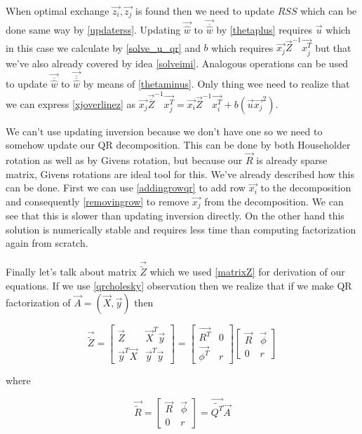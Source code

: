 When optimal exchange $\vec{z_i}, \vec{z_j}$ is found then we need to update $RSS$ which can be done same way by \ref{updaterss}. Updating $\vec{\hat{w}}$ to  $\vec{\overline{\hat{w}}}$ by \ref{thetaplus} requires
$\vec{u}$  which in this case we calculate by \ref{solve_u_qr} and $b$ which requires  $\vec{x_j}\vec{Z}^{-1}\vec{x_j^T}$ but that we've also already covered by idea \ref{solveimi}. Analogous operations can be used to update $\vec{\overline{\hat{w}}}$ to $\vec{\overline{\overline{\hat{w}}}}$  by means of \ref{thetaminus}. Only thing wee need to realize that we can express \ref{xjoverlinez} as $\vec{x_j}\vec{\overline{{Z}}}^{-1}\vec{x_j^T} = \vec{x_i}\vec{{{Z}}}^{-1}\vec{x_i^T} + b(\vec{u}\vec{x_j}^2)$.

We can't use updating inversion because we don't have one so we need to somehow update our QR decomposition. This can be done by both Householder rotation as well as by Givens rotation, but because our $\vec{R}$ is already sparse matrix, Givens rotations are ideal tool for this. We've already described how this can be done. First we can use \ref{addingrowqr} to add row $\vec{x_i}$ to the decomposition and consequently \ref{removingrow} to remove $\vec{x_j}$  from the decomposition. We can see that this is slower than updating inversion directly. On the other hand this solution is numerically stable and requires less time than computing factorization again from scratch. 

Finally let's talk about matrix $\vec{\tilde{Z}}$ which we used \ref{matrixZ} for derivation of our equations. If we use \ref{qrcholesky} observation then we realize that if we make QR factorization of $\vec{A} = (\vec{X}, \vec{y})$ then

\begin{equation}
	\vec{\tilde{Z}} = 
	\begin{bmatrix}
		\vec{Z} & \vec{X}^T\vec{y} \\
    \vec{y}^T\vec{X} & \vec{y}^T\vec{y}
	\end{bmatrix} 
	= 
	\begin{bmatrix}
		\vec{R^T} & 0 \\
    \vec{\phi^T} & r
	\end{bmatrix} 
	\begin{bmatrix} 
		\vec{R} & \vec{\phi} \\
     0 & r
	\end{bmatrix} 
\end{equation}

where 

\begin{equation}
	\vec{\tilde{R}} = 
	\begin{bmatrix}
		\vec{R} & \vec{\phi} \\
     0 & r
	\end{bmatrix} 
	= \vec{\tilde{Q^T}}\vec{A}
\end{equation}

